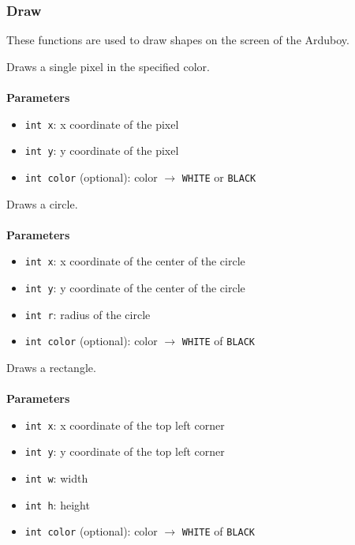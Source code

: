 \documentclass[11pt,fleqn]{book} %
\begin{document}
\subsubsection{Draw}
These functions are used to draw shapes on the screen of the Arduboy.

\begin{libf}[drawPixel(x, y, \emph{color=WHITE})]
	Draws a single pixel in the specified color.\\ \\
	\textbf{Parameters}
	\begin{itemize}
		\item \texttt{int x}: x coordinate of the pixel
		\item \texttt{int y}: y coordinate of the pixel
		\item \texttt{int color} (optional): color $\rightarrow$ \texttt{WHITE} or \texttt{BLACK}
	\end{itemize}
\end{libf}

\begin{libf}[drawCircle(x, y, r, \emph{color=WHITE})]
	Draws a circle.\\ \\
	\textbf{Parameters}
	\begin{itemize}
		\item \texttt{int x}: x coordinate of the center of the circle
		\item \texttt{int y}: y coordinate of the center of the circle
		\item \texttt{int r}: radius of the circle
		\item \texttt{int color} (optional): color $\rightarrow$ \texttt{WHITE} of \texttt{BLACK}
	\end{itemize}
\end{libf}

\begin{libf}[drawRect(x, y, w, h, \emph{color=WHITE})]
	Draws a rectangle.\\ \\
	\textbf{Parameters}
	\begin{itemize}
		\item \texttt{int x}: x coordinate of the top left corner
		\item \texttt{int y}: y coordinate of the top left corner
		\item \texttt{int w}: width
		\item \texttt{int h}: height
		\item \texttt{int color} (optional): color $\rightarrow$ \texttt{WHITE} of \texttt{BLACK}
	\end{itemize}
\end{libf}
\end{document}
